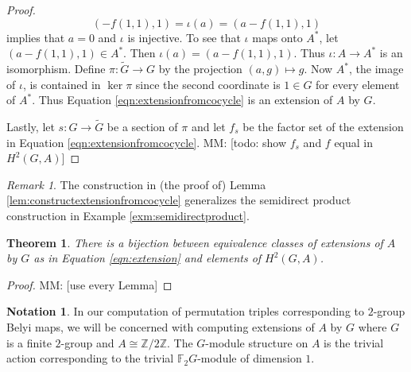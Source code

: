 \documentclass{dcthesis}
\newcommand{\ZZ}{\mathbb Z}
\newcommand{\mm}[1]{{\color{blue} \sf MM: [#1]}}
\newcommand{\wt}[1]{\widetilde{#1}}
\newcommand{\FF}{\mathbb{F}}
\renewcommand{\ker}{\operatorname{ker}}
\newtheorem{theorem}[prop]{Theorem}
\theoremstyle{definition}
\newtheorem{notation}[prop]{Notation}
\theoremstyle{remark}
\newtheorem{remark}[prop]{Remark}
\numberwithin{equation}{section}
\numberwithin{figure}{section}
\begin{document}
{{\begin{proof}
\begin{equation}
        (-f(1,1),1) =\iota(a)
                    =(a-f(1,1),1)
      \end{equation}
      implies that $a=0$
      and $\iota$ is injective.
      To see that $\iota$ maps onto $A^*$,
      let $(a-f(1,1),1)\in A^*$.
      Then $\iota(a)=(a-f(1,1),1)$.
      Thus $\iota\colon A\to A^*$ is an isomorphism.
      Define $\pi\colon\wt{G}\to G$ by
      the projection
      $(a,g)\mapsto g$.
      Now $A^*$, the image of $\iota$,
      is contained in $\ker\pi$
      since the second coordinate is $1\in G$
      for every element of $A^*$.
      Thus
      Equation
      \ref{eqn:extensionfromcocycle}
      is an extension of $A$ by $G$.
      \par
      Lastly,
      let $s\colon G\to\wt{G}$
      be a section of $\pi$
      and let $f_s$ be the factor set
      of the extension in
      Equation
      \ref{eqn:extensionfromcocycle}.
      \mm{todo: show $f_s$ and $f$ equal in $H^2(G,A)$}
    \end{proof}
    \begin{remark}
      \label{rmk:semidirectproducttrivialcocycle}
      The construction in (the proof of)
      Lemma \ref{lem:constructextensionfromcocycle}
      generalizes the semidirect product construction
      in Example \ref{exm:semidirectproduct}.
    \end{remark}
    \begin{theorem}
      \label{thm:dfthm36}
      There is a bijection between equivalence
      classes of extensions of $A$ by $G$
      as in Equation
      \ref{eqn:extension}
      and
      elements of $H^2(G,A)$.
    \end{theorem}
    \begin{proof}
      \mm{use every Lemma}
    \end{proof}
    \begin{notation}
      \label{not:oursetting}
      In our computation of permutation triples
      corresponding to $2$-group Belyi maps,
      we will be concerned with computing
      extensions of $A$ by $G$
      where $G$ is a finite $2$-group
      and $A\cong\ZZ/2\ZZ$.
      The $G$-module structure on $A$
      is the trivial action corresponding
      to the trivial $\FF_2G$-module of dimension $1$.
    \end{notation}
  }
}
\end{document}
